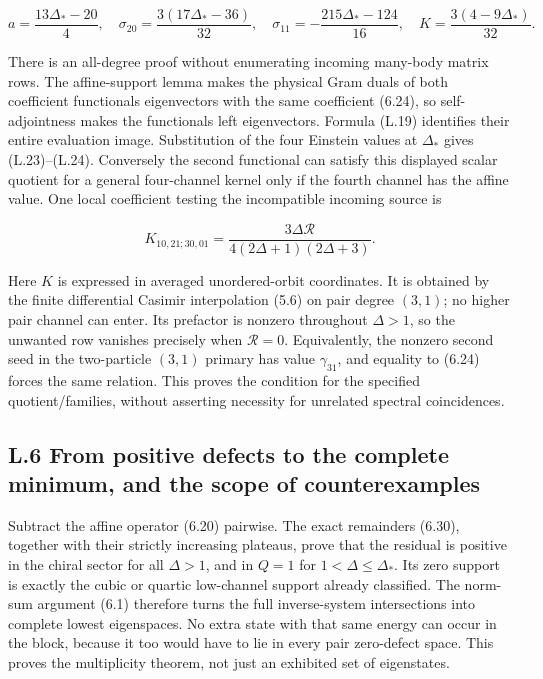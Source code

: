 \documentclass[a4paper,11pt]{article}
\numberwithin{equation}{section}
\begin{document}
\[
a=\frac{13\Delta_*-20}{4},\quad
\sigma_{20}=\frac{3(17\Delta_*-36)}{32},\quad
\sigma_{11}=-\frac{215\Delta_*-124}{16},\quad
K=\frac{3(4-9\Delta_*)}{32}.
\tag{L.24}
\]

There is an all-degree proof without enumerating incoming many-body matrix rows. The affine-support lemma makes the physical Gram duals of both coefficient functionals eigenvectors with the same coefficient (6.24), so self-adjointness makes the functionals left eigenvectors. Formula (L.19) identifies their entire evaluation image. Substitution of the four Einstein values at \(\Delta_*\) gives (L.23)--(L.24). Conversely the second functional can satisfy this displayed scalar quotient for a general four-channel kernel only if the fourth channel has the affine value. One local coefficient testing the incompatible incoming source is

\[
K_{10,21;30,01}=\frac{3\Delta\mathcal R}{4(2\Delta+1)(2\Delta+3)}.
\tag{L.25}
\]

Here \(K\) is expressed in averaged unordered-orbit coordinates. It is obtained by the finite differential Casimir interpolation (5.6) on pair degree \((3,1)\); no higher pair channel can enter. Its prefactor is nonzero throughout \(\Delta>1\), so the unwanted row vanishes precisely when \(\mathcal R=0\). Equivalently, the nonzero second seed in the two-particle \((3,1)\) primary has value \(\gamma_{31}\), and equality to (6.24) forces the same relation. This proves the condition for the specified quotient/families, without asserting necessity for unrelated spectral coincidences.

\hypertarget{l.6-from-positive-defects-to-the-complete-minimum-and-the-scope-of-counterexamples}{%
\subsection{L.6 From positive defects to the complete minimum, and the scope of counterexamples}\label{l.6-from-positive-defects-to-the-complete-minimum-and-the-scope-of-counterexamples}}

Subtract the affine operator (6.20) pairwise. The exact remainders (6.30), together with their strictly increasing plateaus, prove that the residual is positive in the chiral sector for all \(\Delta>1\), and in \(Q=1\) for \(1<\Delta\le\Delta_*\). Its zero support is exactly the cubic or quartic low-channel support already classified. The norm-sum argument (6.1) therefore turns the full inverse-system intersections into complete lowest eigenspaces. No extra state with that same energy can occur in the block, because it too would have to lie in every pair zero-defect space. This proves the multiplicity theorem, not just an exhibited set of eigenstates.
\end{document}
